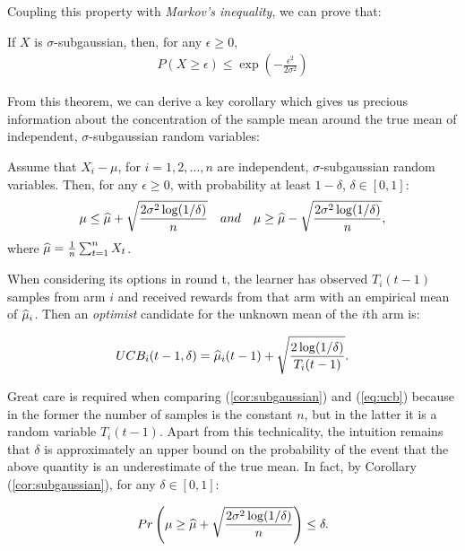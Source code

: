 Coupling this property with \emph{Markov's inequality}, we can prove that:

\begin{theorem} \cite{lattimore2019bandit} 
If $X$ is $\sigma$-subgaussian, then, for any $\epsilon\geq 0$,
\begin{align*}
P(X\geq\epsilon)\leq\exp\left(-\frac{\epsilon^2}{2\sigma^2}\right)
\end{align*}
\end{theorem}

From this theorem, we can derive a key corollary which gives us precious information about the concentration of the sample mean around the true mean of independent, $\sigma$-subgaussian random variables: 

\begin{corollary} \label{cor:subgaussian}
Assume that $X_i - \mu$, for $i=1,2,\dots,n$ are independent, $\sigma$-subgaussian random variables. Then, for any $\epsilon\geq 0$, with probability at least $1-\delta$, $\delta\in [0,1]$: 
\begin{align*}
\mu\leq\widehat{\mu}+\sqrt{\frac{2\sigma^2\log(1/\delta)}{n}} \enspace\enspace and \enspace\enspace \mu\geq\widehat{\mu}-\sqrt{\frac{2\sigma^2\log(1/\delta)}{n}},
\end{align*}
where $\widehat{\mu}=\frac{1}{n}\sum_{t=1}^{n}X_t$.
\end{corollary}

When considering its options in round t, the learner has observed $T_i(t-1)$ samples from arm $i$ and received rewards from that arm with an empirical mean of $\widehat{\mu}_i$. Then an \emph{optimist} candidate for the unknown mean of the $i$th arm is:

\begin{align} \label{eq:ucb}
UCB_i(t-1, \delta) = \widehat{\mu}_i(t-1) + \sqrt{\frac{2\log(1/\delta)}{T_i(t-1)}}.
\end{align}

Great care is required when comparing (\ref{cor:subgaussian}) and (\ref{eq:ucb}) because in the former the number of samples is the constant $n$, but in the latter it is a random variable
$T_i(t-1)$. Apart from this technicality, the intuition remains that $\delta$ is approximately an upper bound on the probability of the event that the above quantity is an underestimate of the true mean. In fact, by Corollary (\ref{cor:subgaussian}), for any $\delta\in [0,1]$:

\begin{align}
Pr\left(\mu\geq\widehat{\mu}+\sqrt{\frac{2\sigma^2\log(1/\delta)}{n}}\right)\leq\delta.
\end{align}

